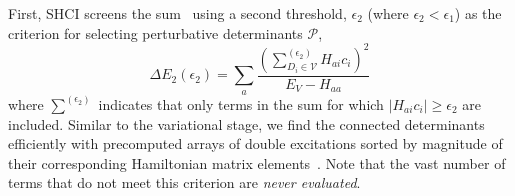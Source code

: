\documentclass[%
reprint,
 superscriptaddress,
 amsmath,amssymb,
 aps,
]{revtex4-1}
\def\V{\mathcal{V}}
\def\P{\mathcal{P}}
\begin{document}
First, SHCI screens the sum~\cite{HolTubUmr-JCTC-16} using a second threshold, $\epsilon_2$ (where $\epsilon_2<\epsilon_1$) as the criterion for selecting perturbative determinants $\P$,
\begin{equation}
\Delta E_{2} \left(\epsilon_{2}\right) = \sum_a \frac{\left(\sum_{D_{i} \in \V}^{(\epsilon_{2})}  H_{a i} c_{i}\right) ^{2}}{E_{V} - H_{a a}}
\label{eq:PTb}
\end{equation}
where $\sum^{(\epsilon_{2})}$ indicates that only terms in the sum for which $\left|H_{a i} c_{i}\right| \ge \epsilon_{2}$ are included.
Similar to the variational stage, we find the connected determinants efficiently with precomputed arrays of
double excitations sorted by magnitude of their corresponding Hamiltonian matrix elements~\cite{HolTubUmr-JCTC-16}.
Note that the vast number of terms that do not meet this criterion are \emph{never evaluated}.
\end{document}
